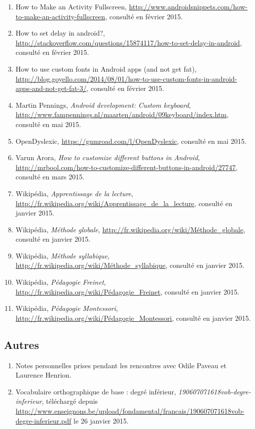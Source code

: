 \begin{enumerate}
\item How to Make an Activity Fullscreen, \url{http://www.androidsnippets.com/how-to-make-an-activity-fullscreen}, consulté en février 2015.

\item How to set delay in android?, \url{http://stackoverflow.com/questions/15874117/how-to-set-delay-in-android}, consulté en février 2015.

\item How to use custom fonts in Android apps (and not get fat), \url{http://blog.goyello.com/2014/08/01/how-to-use-custom-fonts-in-android-apps-and-not-get-fat-3/}, consulté en février 2015.

\item Martin Pennings, \textit{Android development: Custom keyboard}, \url{http://www.fampennings.nl/maarten/android/09keyboard/index.htm}, consulté en mai 2015.

\item OpenDyslexic, \url{https://gumroad.com/l/OpenDyslexic}, consulté en mai 2015.

\item Varun Arora, \textit{How to customize different buttons in Android}, \url{http://mrbool.com/how-to-customize-different-buttons-in-android/27747}, consulté en mars 2015.

\item Wikipédia, \textit{Apprentissage de la lecture}, \url{http://fr.wikipedia.org/wiki/Apprentissage_de_la_lecture}, consulté en janvier 2015.

\item Wikipédia, \textit{Méthode globale}, \url{http://fr.wikipedia.org/wiki/Méthode_globale}, consulté en janvier 2015.

\item Wikipédia, \textit{Méthode syllabique}, \url{http://fr.wikipedia.org/wiki/Méthode_syllabique}, consulté en janvier 2015.

\item Wikipédia, \textit{Pédagogie Freinet}, \url{http://fr.wikipedia.org/wiki/Pédagogie_Freinet}, consulté en janvier 2015.

\item Wikipédia, \textit{Pédagogie Montessori}, \url{http://fr.wikipedia.org/wiki/Pédagogie_Montessori}, consulté en janvier 2015.


\end{enumerate}

\subsection*{Autres}
\begin{enumerate}
\item Notes personnelles prises pendant les rencontres avec Odile Paveau et Laurence Henrion.

\item Vocabulaire orthographique de base : degré inférieur, \textit{190607071618vob-degre-inferieur}, téléchargé depuis \url{http://www.enseignons.be/upload/fondamental/francais/190607071618vob-degre-inferieur.pdf} le 26 janvier 2015.
\end{enumerate}